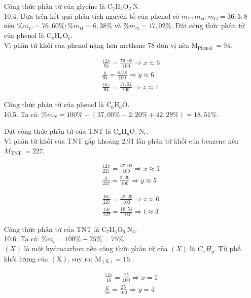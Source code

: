 \documentclass[10pt]{article}
\begin{document}
Công thức phân tử của glycine là $\mathrm{C}_{2} \mathrm{H}_{5} \mathrm{O}_{2} \mathrm{~N}$.\\
10.4. Dựa trên kết quả phân tích nguyên tố của phenol có $m_{C}: m_{H}: m_{O}=36: 3: 8$ nên $\% m_{C}=76,60 \% ; \% m_{H}=6,38 \%$ và $\% m_{O}=17,02 \%$. Đặt công thức phân tử của phenol là $\mathrm{C}_{\mathrm{x}} \mathrm{H}_{\mathrm{y}} \mathrm{O}_{\mathrm{z}}$.\\
Vì phân tử khối của phenol nặng hơn methane 78 đơn vị nên $\mathrm{M}_{\text {Phenol }}=94$.

$$
\begin{aligned}
& \frac{12 x}{94}=\frac{76,60}{100} \Rightarrow x \approx 6 \\
& \frac{y}{94}=\frac{6,38}{100} \Rightarrow y \approx 6 \\
& \frac{16 z}{94}=\frac{17,02}{100} \Rightarrow z \approx 1
\end{aligned}
$$

Công thức phân tử của phenol là $\mathrm{C}_{6} \mathrm{H}_{6} \mathrm{O}$.\\
10.5. Ta có: $\% m_{N}=100 \%-(37,00 \%+2,20 \%+42,29 \%)=18,51 \%$.

Đặt công thức phân tử của TNT là $\mathrm{C}_{x} \mathrm{H}_{y} \mathrm{O}_{z} \mathrm{~N}_{t}$.\\
Vì phân tử khối của TNT gấp khoảng 2,91 lần phân tử khối của benzene nên $M_{\text {TNT }}=227$.

$$
\begin{aligned}
& \frac{12 x}{227}=\frac{37,00}{100} \Rightarrow x \approx 1 \\
& \frac{y}{227}=\frac{2,20}{100} \Rightarrow y \approx 5
\end{aligned}
$$

$$
\begin{aligned}
& \frac{16 z}{227}=\frac{42,29}{100} \Rightarrow z \approx 6 \\
& \frac{14 t}{227}=\frac{18,51}{100} \Rightarrow t \approx 3
\end{aligned}
$$

Công thức phân tử của TNT là $\mathrm{C}_{7} \mathrm{H}_{5} \mathrm{O}_{6} \mathrm{~N}_{3}$.\\
10.6. Ta có: $\% m_{c}=100 \%-25 \%=75 \%$.\\
$(X)$ là một hydrocarbon nên công thức phân tử của $(X)$ là $C_{x} H_{y}$. Từ phổ khối lượng của $(\mathrm{X})$, suy ra: $\mathrm{M}_{(\mathrm{X})}=16$.

$$
\begin{aligned}
& \frac{12 x}{16}=\frac{75}{100} \Rightarrow x=1 \\
& \frac{y}{16}=\frac{25}{100} \Rightarrow y=4
\end{aligned}
$$
\end{document}
